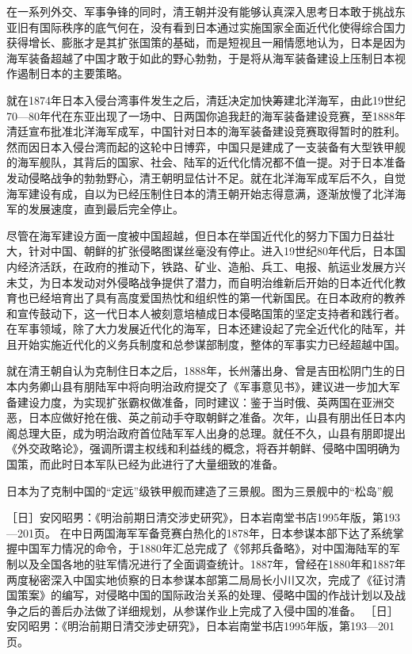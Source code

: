 \documentclass[12pt,UTF8]{ctexbook}
\begin{document}
在一系列外交、军事争锋的同时，清王朝并没有能够认真深入思考日本敢于挑战东亚旧有国际秩序的底气何在，没有看到日本通过实施国家全面近代化使得综合国力获得增长、膨胀才是其扩张国策的基础，而是短视且一厢情愿地认为，日本是因为海军装备超越了中国才敢于如此的野心勃勃，于是将从海军装备建设上压制日本视作遏制日本的主要策略。

就在1874年日本入侵台湾事件发生之后，清廷决定加快筹建北洋海军，由此19世纪70—80年代在东亚出现了一场中、日两国你追我赶的海军装备建设竞赛，至1888年清廷宣布批准北洋海军成军，中国针对日本的海军装备建设竞赛取得暂时的胜利。然而因日本入侵台湾而起的这轮中日博弈，中国只是建成了一支装备有大型铁甲舰的海军舰队，其背后的国家、社会、陆军的近代化情况都不值一提。对于日本准备发动侵略战争的勃勃野心，清王朝明显估计不足。就在北洋海军成军后不久，自觉海军建设有成，自以为已经压制住日本的清王朝开始志得意满，逐渐放慢了北洋海军的发展速度，直到最后完全停止。

尽管在海军建设方面一度被中国超越，但日本在举国近代化的努力下国力日益壮大，针对中国、朝鲜的扩张侵略图谋丝毫没有停止。进入19世纪80年代后，日本国内经济活跃，在政府的推动下，铁路、矿业、造船、兵工、电报、航运业发展方兴未艾，为日本发动对外侵略战争提供了潜力，而自明治维新后开始的日本近代化教育也已经培育出了具有高度爱国热忱和组织性的第一代新国民。在日本政府的教养和宣传鼓动下，这一代日本人被刻意培植成日本侵略国策的坚定支持者和践行者。在军事领域，除了大力发展近代化的海军，日本还建设起了完全近代化的陆军，并且开始实施近代化的义务兵制度和总参谋部制度，整体的军事实力已经超越中国。

就在清王朝自认为克制住日本之后，1888年，长州藩出身、曾是吉田松阴门生的日本内务卿山县有朋陆军中将向明治政府提交了《军事意见书》，建议进一步加大军备建设力度，为实现扩张霸权做准备，同时建议：鉴于当时俄、英两国在亚洲交恶，日本应做好抢在俄、英之前动手夺取朝鲜之准备。次年，山县有朋出任日本内阁总理大臣，成为明治政府首位陆军军人出身的总理。就任不久，山县有朋即提出《外交政略论》，强调所谓主权线和利益线的概念，将吞并朝鲜、侵略中国明确为国策，而此时日本军队已经为此进行了大量细致的准备。


日本为了克制中国的“定远”级铁甲舰而建造了三景舰。图为三景舰中的“松岛”舰

［日］安冈昭男：《明治前期日清交涉史研究》，日本岩南堂书店1995年版，第193—201页。
在中日两国海军军备竞赛白热化的1878年，日本参谋本部下达了系统掌握中国军力情况的命令，于1880年汇总完成了《邻邦兵备略》，对中国海陆军的军制以及全国各地的驻军情况进行了全面调查统计。1887年，曾经在1880年和1887年两度秘密深入中国实地侦察的日本参谋本部第二局局长小川又次，完成了《征讨清国策案》的编写，对侵略中国的国际政治关系的处理、侵略中国的作战计划以及战争之后的善后办法做了详细规划，从参谋作业上完成了入侵中国的准备。 ［日］安冈昭男：《明治前期日清交涉史研究》，日本岩南堂书店1995年版，第193—201页。
\end{document}

